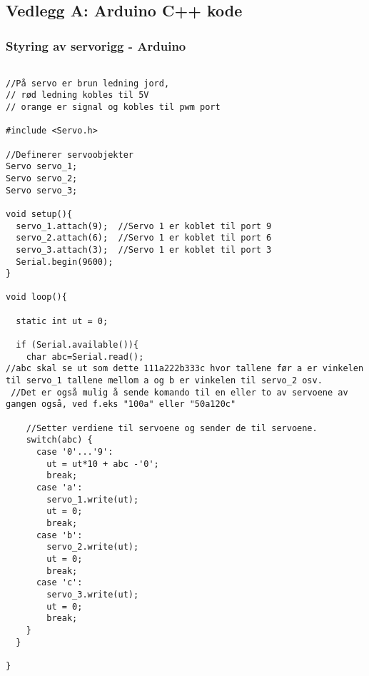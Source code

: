 \subsection{Vedlegg A: Arduino C++ kode}

\begin{frame}
\frametitle{Styring av servorigg - Arduino}
\begin{lstlisting}

//På servo er brun ledning jord, 
// rød ledning kobles til 5V 
// orange er signal og kobles til pwm port

#include <Servo.h>

//Definerer servoobjekter
Servo servo_1; 
Servo servo_2;
Servo servo_3;

void setup(){
  servo_1.attach(9);  //Servo 1 er koblet til port 9
  servo_2.attach(6);  //Servo 1 er koblet til port 6
  servo_3.attach(3);  //Servo 1 er koblet til port 3
  Serial.begin(9600);
}

void loop(){
  
  static int ut = 0;
  
  if (Serial.available()){
    char abc=Serial.read(); 
//abc skal se ut som dette 111a222b333c hvor tallene før a er vinkelen til servo_1 tallene mellom a og b er vinkelen til servo_2 osv.
 //Det er også mulig å sende komando til en eller to av servoene av gangen også, ved f.eks "100a" eller "50a120c"
    
    //Setter verdiene til servoene og sender de til servoene.
    switch(abc) {
      case '0'...'9':
        ut = ut*10 + abc -'0';
        break;
      case 'a':
        servo_1.write(ut);
        ut = 0;
        break;
      case 'b':
        servo_2.write(ut);
        ut = 0;
        break;
      case 'c':
        servo_3.write(ut);
        ut = 0;
        break;
    }
  }
  
}  

\end{lstlisting}
\end{frame}